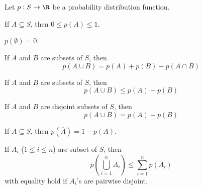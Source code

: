 Let $p : S \rightarrow \R$ be 
a probability distribution function.
\begin{myenum}
\item If $A \subseteq S$, then $0 \leq p(A) \leq 1$.
\item $p(\emptyset) = 0$.
\item If $A$ and $B$ are subsets of $S$, then
\[
p(A \cup B) = p(A) + p(B) - p(A \cap B)
\]
\item If $A$ and $B$ are subsets of $S$, then
\[
p(A \cup B) \leq p(A) + p(B)
\]
\item If $A$ and $B$ are disjoint subsets of $S$, then
\[
p(A \cup B) = p(A) + p(B)
\]
\item If $A \subseteq S$, then $p(\overline{A}) = 1 - p(A)$.
\item If $A_i$ ($1 \leq i \leq n$) are subset of $S$, then
\[
p \left( \bigcup_{i=1}^n A_i \right) \leq \sum_{i=1}^n p(A_i)
\]
with equality hold if $A_i$'s are pairwise disjoint.
\end{myenum}
